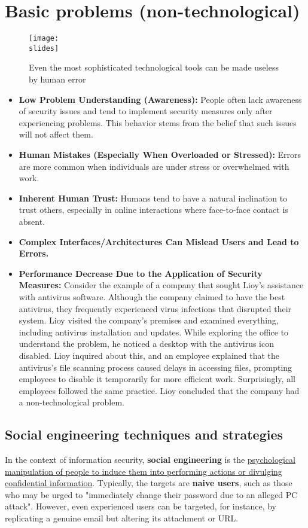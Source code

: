 \section{Basic problems (non-technological)}
\begin{figure}[h]
  \centering
  \texttt{[image: \\slides]}
  \caption{Even the most sophisticated technological tools can be
    made useless by human error}
\end{figure}

\begin{itemize}
  \item \textbf{Low Problem Understanding (Awareness):} People often lack awareness of security issues and tend to implement security measures only after experiencing problems. This behavior stems from the belief that such issues will not affect them.
  \item \textbf{Human Mistakes (Especially When Overloaded or Stressed):} Errors are more common when individuals are under stress or overwhelmed with work.
  \item \textbf{Inherent Human Trust:} Humans tend to have a natural inclination to trust others, especially in online interactions where face-to-face contact is absent.
  \item \textbf{Complex Interfaces/Architectures Can Mislead Users and Lead to Errors.}
  \item \textbf{Performance Decrease Due to the Application of Security Measures:} Consider the example of a company that sought Lioy's assistance with antivirus software. Although the company claimed to have the best antivirus, they frequently experienced virus infections that disrupted their system. Lioy visited the company's premises and examined everything, including antivirus installation and updates. While exploring the office to understand the problem, he noticed a desktop with the antivirus icon disabled. Lioy inquired about this, and an employee explained that the antivirus's file scanning process caused delays in accessing files, prompting employees to disable it temporarily for more efficient work. Surprisingly, all employees followed the same practice. Lioy concluded that the company had a non-technological problem.
\end{itemize}

\subsection{Social engineering techniques and strategies}
In the context of information security, \textbf{social engineering} is the \ul{psychological manipulation of people to induce them into performing actions or divulging confidential information}. Typically, the targets are \textbf{naive users}, such as those who may be urged to "immediately change their password due to an alleged PC attack". However, even experienced users can be targeted, for instance, by replicating a genuine email but altering its attachment or URL.

